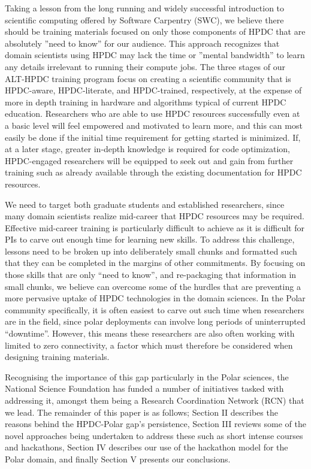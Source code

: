 \documentclass[conference]{IEEEtran}
\begin{document}
Taking a lesson from the long running and widely successful introduction to scientific computing offered by Software Carpentry (SWC)\cite{Wilson2014-pc}, we believe there should be training materials focused on only those components of HPDC that are absolutely ''need to know'' for our audience. This approach recognizes that domain scientists using HPDC may lack the time or ''mental bandwidth'' to learn any details irrelevant to running their compute jobs. The three stages of our ALT-HPDC training program focus on creating a scientific community that is HPDC-aware, HPDC-literate, and HPDC-trained, respectively, at the expense of more in depth training in hardware and algorithms typical of current HPDC education.  Researchers who are able to use HPDC resources successfully even at a basic level will feel empowered and motivated to learn more, and this can most easily be done if the initial time requirement for getting started is minimized. If, at a later stage, greater in-depth knowledge is required for code optimization, HPDC-engaged researchers will be equipped to seek out and gain from further training such as already available through the existing documentation for HPDC resources.

We need to target both graduate students and established researchers, since many domain scientists realize mid-career that HPDC resources may be required. Effective mid-career training is particularly difficult to achieve as it is difficult for PIs to carve out enough time for learning new skills. To address this challenge, lessons need to be broken up into deliberately small chunks and formatted such that they can be completed in the margins of other commitments. By focusing on those skills that are only “need to know”, and re-packaging that information in small chunks, we believe can overcome some of the hurdles that are preventing a more pervasive uptake of HPDC technologies in the domain sciences.  In the Polar community specifically, it is often easiest to carve out such time when researchers are in the field, since polar deployments can involve long periods of uninterrupted “downtime”.  However, this means these researchers are also often working with limited to zero connectivity, a factor which must therefore be considered when designing training materials.

Recognising the importance of this gap particularly in the Polar sciences, the National Science Foundation has funded a number of initiatives tasked with addressing it, amongst them being a Research Coordination Network (RCN) that we lead. The remainder of this paper is as follows; Section II describes the reasons behind the HPDC-Polar gap’s persistence, Section III reviews some of the novel approaches being undertaken to address these such as short intense courses and hackathons, Section IV describes our use of the hackathon model for the Polar domain, and finally Section V presents our conclusions.
\end{document}
